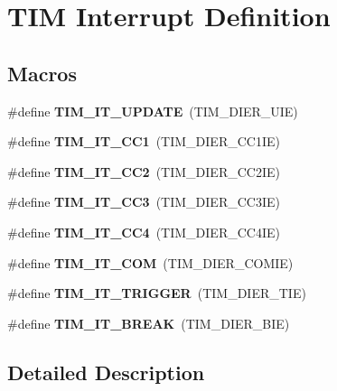 \hypertarget{group___t_i_m___interrupt__definition}{}\section{T\+IM Interrupt Definition}
\label{group___t_i_m___interrupt__definition}
\subsection*{Macros}
\begin{DoxyCompactItemize}
\item 
\mbox{\label{group___t_i_m___interrupt__definition_ga6a48ecf88cae0402ff084202bfdd4f8e}} 
\#define {\bfseries T\+I\+M\+\_\+\+I\+T\+\_\+\+U\+P\+D\+A\+TE}~(T\+I\+M\+\_\+\+D\+I\+E\+R\+\_\+\+U\+IE)
\item 
\mbox{\label{group___t_i_m___interrupt__definition_ga02267a938ab4722c5013fffa447cf5a6}} 
\#define {\bfseries T\+I\+M\+\_\+\+I\+T\+\_\+\+C\+C1}~(T\+I\+M\+\_\+\+D\+I\+E\+R\+\_\+\+C\+C1\+IE)
\item 
\mbox{\label{group___t_i_m___interrupt__definition_ga60f6b6c424b62ca58d3fafd8f5955e4f}} 
\#define {\bfseries T\+I\+M\+\_\+\+I\+T\+\_\+\+C\+C2}~(T\+I\+M\+\_\+\+D\+I\+E\+R\+\_\+\+C\+C2\+IE)
\item 
\mbox{\label{group___t_i_m___interrupt__definition_ga6aef020aebafd9e585283fbbaf8b841f}} 
\#define {\bfseries T\+I\+M\+\_\+\+I\+T\+\_\+\+C\+C3}~(T\+I\+M\+\_\+\+D\+I\+E\+R\+\_\+\+C\+C3\+IE)
\item 
\mbox{\label{group___t_i_m___interrupt__definition_ga1dce7f1bc32a258f2964cb7c05f413a6}} 
\#define {\bfseries T\+I\+M\+\_\+\+I\+T\+\_\+\+C\+C4}~(T\+I\+M\+\_\+\+D\+I\+E\+R\+\_\+\+C\+C4\+IE)
\item 
\mbox{\label{group___t_i_m___interrupt__definition_gaeb7eff6c39922814e7ee47c0820c3d9f}} 
\#define {\bfseries T\+I\+M\+\_\+\+I\+T\+\_\+\+C\+OM}~(T\+I\+M\+\_\+\+D\+I\+E\+R\+\_\+\+C\+O\+M\+IE)
\item 
\mbox{\label{group___t_i_m___interrupt__definition_ga2a577f2eee61f101cf551d86c4d73333}} 
\#define {\bfseries T\+I\+M\+\_\+\+I\+T\+\_\+\+T\+R\+I\+G\+G\+ER}~(T\+I\+M\+\_\+\+D\+I\+E\+R\+\_\+\+T\+IE)
\item 
\mbox{\label{group___t_i_m___interrupt__definition_ga351a8f27975e0af87f4bb37a4feaa636}} 
\#define {\bfseries T\+I\+M\+\_\+\+I\+T\+\_\+\+B\+R\+E\+AK}~(T\+I\+M\+\_\+\+D\+I\+E\+R\+\_\+\+B\+IE)
\end{DoxyCompactItemize}


\subsection{Detailed Description}
